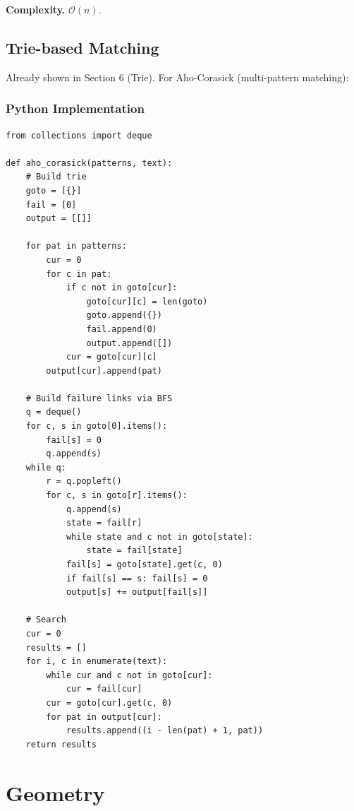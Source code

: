 \documentclass[10pt,a4paper]{article}
\theoremstyle{cpstyle}
\newcommand{\bigO}[1]{\mathcal{O}\!\left(#1\right)}
\begin{document}
\textbf{Complexity.} $\bigO{n}$.

\subsection{Trie-based Matching}

Already shown in Section 6 (Trie). For Aho-Corasick (multi-pattern matching):

\subsubsection{Python Implementation}
\begin{lstlisting}[caption={Aho-Corasick multi-pattern matching}]
from collections import deque

def aho_corasick(patterns, text):
    # Build trie
    goto = [{}]
    fail = [0]
    output = [[]]

    for pat in patterns:
        cur = 0
        for c in pat:
            if c not in goto[cur]:
                goto[cur][c] = len(goto)
                goto.append({})
                fail.append(0)
                output.append([])
            cur = goto[cur][c]
        output[cur].append(pat)

    # Build failure links via BFS
    q = deque()
    for c, s in goto[0].items():
        fail[s] = 0
        q.append(s)
    while q:
        r = q.popleft()
        for c, s in goto[r].items():
            q.append(s)
            state = fail[r]
            while state and c not in goto[state]:
                state = fail[state]
            fail[s] = goto[state].get(c, 0)
            if fail[s] == s: fail[s] = 0
            output[s] += output[fail[s]]

    # Search
    cur = 0
    results = []
    for i, c in enumerate(text):
        while cur and c not in goto[cur]:
            cur = fail[cur]
        cur = goto[cur].get(c, 0)
        for pat in output[cur]:
            results.append((i - len(pat) + 1, pat))
    return results
\end{lstlisting}

\clearpage
\section{Geometry}
\end{document}
